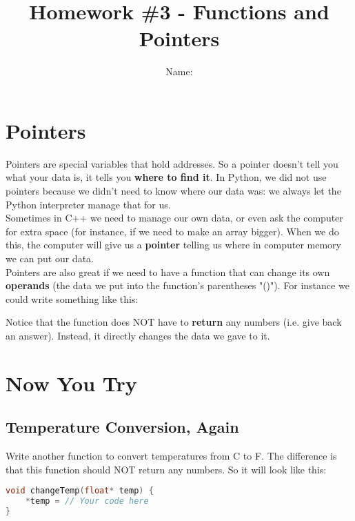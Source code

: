 \documentclass[a4paper,12pt]{article} %
\title{\textbf{Homework \#3 - Functions and Pointers}}
\author{Name: }
\date{} %
\begin{document}
\maketitle %

\section{Pointers}

Pointers are special variables that hold addresses. So a pointer doesn't tell you what your data is, it tells you \textbf{where to find it}. In Python, we did not use pointers because we didn't need to know where our data was: we always let the Python interpreter manage that for us.\\

\noindent
Sometimes in C++ we need to manage our own data, or even ask the computer for extra space (for instance, if we need to make an array bigger). When we do this, the computer will give us a \textbf{pointer} telling us where in computer memory we can put our data.\\

\noindent
Pointers are also great if we need to have a function that can change its own \textbf{operands} (the data we put into the function's parentheses "()"). For instance we could write something like this:

\vspace{5mm}


\noindent
Notice that the function does NOT have to \textbf{return} any numbers (i.e. give back an answer). Instead, it directly changes the data we gave to it.

\section{Now You Try}

\subsection{Temperature Conversion, Again}

Write another function to convert temperatures from C to F. The difference is that this function should NOT return any numbers. So it will look like this:

\vspace{5mm}
\begin{lstlisting}[language=C++]
void changeTemp(float* temp) {
	*temp = // Your code here
}
\end{lstlisting}
\end{document}
